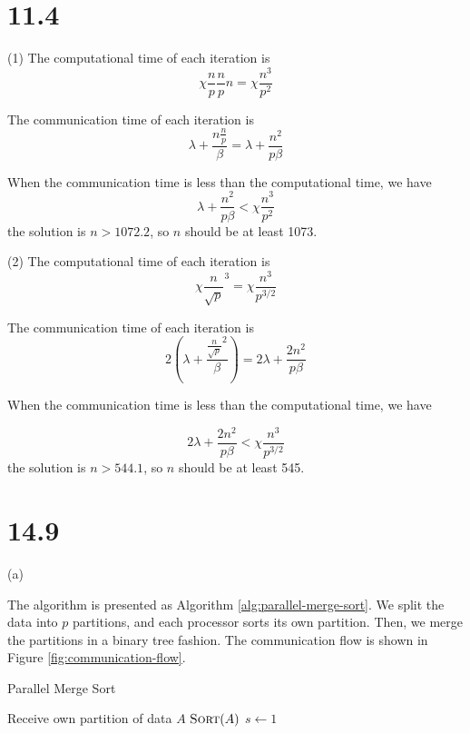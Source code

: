 \section*{11.4}
(1)
The computational time of each iteration is
$$
\chi\frac{n}{p}\frac{n}{p}n=\chi\frac{n^3}{p^2}
$$

The communication time of each iteration is
$$
\lambda + \frac{n\frac{n}{p}}{\beta} = \lambda + \frac{n^2}{p\beta}
$$

When the communication time is less than the computational time, we have
$$
\lambda + \frac{n^2}{p\beta} < \chi\frac{n^3}{p^2}
$$
the solution is $n>1072.2$, so $n$ should be at least 1073.

(2)
The computational time of each iteration is
$$
\chi\frac{n}{\sqrt p}^3=\chi\frac{n^3}{p^{3/2}}
$$

The communication time of each iteration is
$$
2\left(\lambda + \frac{\frac{n}{\sqrt p}^2}{\beta}\right) = 2\lambda + \frac{2n^2}{p\beta}
$$

When the communication time is less than the computational time, we have

$$
2\lambda + \frac{2n^2}{p\beta} < \chi\frac{n^3}{p^{3/2}}
$$
the solution is $n>544.1$, so $n$ should be at least 545.

\section*{14.9}

(a)

The algorithm is presented as Algorithm \ref{alg:parallel-merge-sort}. We split the data into $p$ partitions, and each processor sorts its own partition. Then, we merge the partitions in a binary tree fashion. The communication flow is shown in Figure \ref{fig:communication-flow}.

\begin{algorithm}
    \SetAlgoLined
    \caption{Parallel Merge Sort}
    \label{alg:parallel-merge-sort}
    \BlankLine
    \BlankLine
    Receive own partition of data $A$\;
    $\textsc{Sort}(A)$\;
    $s \leftarrow 1$\;
\end{algorithm}

